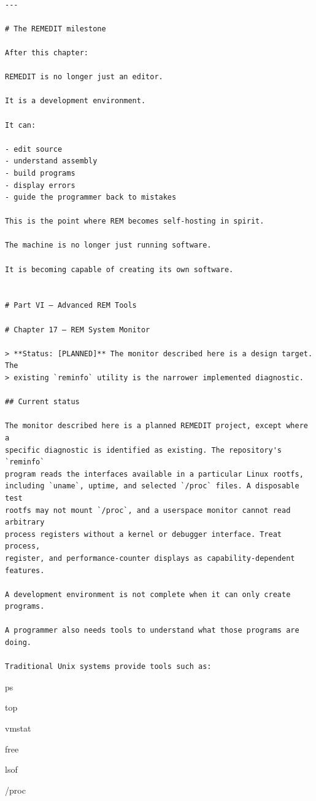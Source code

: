 \documentclass[
  oneside,
  openany]{book}
\begin{document}
\begin{verbatim}

---

# The REMEDIT milestone

After this chapter:

REMEDIT is no longer just an editor.

It is a development environment.

It can:

- edit source
- understand assembly
- build programs
- display errors
- guide the programmer back to mistakes

This is the point where REM becomes self-hosting in spirit.

The machine is no longer just running software.

It is becoming capable of creating its own software.


# Part VI — Advanced REM Tools

# Chapter 17 — REM System Monitor

> **Status: [PLANNED]** The monitor described here is a design target. The
> existing `reminfo` utility is the narrower implemented diagnostic.

## Current status

The monitor described here is a planned REMEDIT project, except where a
specific diagnostic is identified as existing. The repository's `reminfo`
program reads the interfaces available in a particular Linux rootfs,
including `uname`, uptime, and selected `/proc` files. A disposable test
rootfs may not mount `/proc`, and a userspace monitor cannot read arbitrary
process registers without a kernel or debugger interface. Treat process,
register, and performance-counter displays as capability-dependent features.

A development environment is not complete when it can only create programs.

A programmer also needs tools to understand what those programs are doing.

Traditional Unix systems provide tools such as:
\end{verbatim}

ps

top

vmstat

free

lsof

/proc
\end{document}
